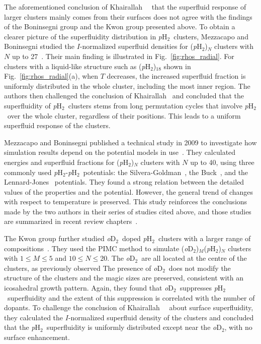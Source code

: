 \documentclass[12pt]{iopart}
\newcommand{\odtwo}{{\em o}D$_2$}
\newcommand{\phtwo}{{\em p}H$_2$}
\begin{document}
The aforementioned conclusion of Khairallah \etal~\cite{magicnumber_pH2}~that the superfluid response of larger clusters mainly comes from their surfaces does not agree with the findings of the Boninsegni group and the Kwon group presented above. 
To obtain a clearer picture of the superfluidity distribution in \phtwo~clusters, Mezzacapo and Boninsegni studied the $I$-normalized superfluid densities for (\phtwo)$_N$ clusters with $N$ up to 27~\cite{local_sup_boninsegni}. 
Their main finding is illustrated in Fig.~\ref{fig:rhos_radial}.
For clusters with  a liquid-like structure such as (\phtwo)$_{18}$ shown in Fig.~\ref{fig:rhos_radial}(a), when $T$ decreases, the increased superfluid fraction is uniformly distributed in the whole cluster, including the most inner region.
The authors then challenged the conclusion of Khairallah \etal~and concluded that the superfluidity of \phtwo~clusters stems from long permutation cycles that involve \phtwo~over the whole cluster, regardless of their positions. 
This leads to a uniform superfluid response of the clusters. 

Mezzacapo and Boninsegni published a technical study in 2009 to investigate how simulation results  depend on the potential models in use~\cite{mezzacapo_ph2_models}. 
They calculated energies and superfluid fractions for (\phtwo)$_N$ clusters with $N$ up to 40, using three commonly used \phtwo-\phtwo~potentials: the Silvera-Goldman~\cite{sg_h2_pot}, the Buck~\cite{buck_h2_pot}, and the Lennard-Jones~\cite{magicnumber_pH2,lj_h2_pot} potentials. 
They found a strong relation between the detailed values of the properties and the potential. 
However, the general trend of changes with respect to temperature is preserved. 
This study reinforces the conclusions made by the two authors in their series of studies cited above, and those studies are summarized in recent review chapters~\cite{mezzacapo_review_h2_sf,boninsegni_melting_review,alonso_hydrogen_review}.

The Kwon group further studied  \odtwo~doped \phtwo~clusters with a larger range of compositions~\cite{shim_h2_d2_sf}. 
They used the PIMC method to simulate (\odtwo)$_M$(\phtwo)$_N$ clusters with $1\le M \le 5$ and $10 \le N \le 20$. 
The \odtwo~are all located at the centre of the clusters, as previously observed
The presence of \odtwo~does not modify the structure of the clusters and the magic sizes are preserved, consistent with an icosahedral growth pattern. 
Again, they found that \odtwo~suppresses \phtwo~superfluidity and the extent of this suppression is correlated with the number of dopants. 
To challenge the conclusion of Khairallah \etal~\cite{magicnumber_pH2}~about surface superfluidity, they calculated the $I$-normalized superfluid density of the clusters and concluded that the \phtwo~superfluidity is uniformly distributed except near the \odtwo, with no surface enhancement.
\end{document}
